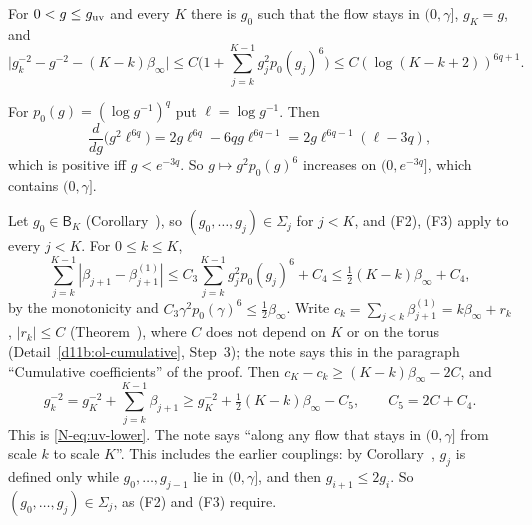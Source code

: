 \begin{detail}\label{d11b:ol-uv}
For $0<g\le g_{\rm uv}$ and every $K$ there is $g_0$ such that the flow stays in $(0,\gamma]$, $g_K=g$, and
\[
\Big|g_k^{-2}-g^{-2}-(K-k)\beta_\infty\Big|\le C\Big(1+\sum_{j=k}^{K-1}g_j^2p_0(g_j)^6\Big)\le C(\log(K-k+2))^{6q+1}.
\]
\end{detail}

\begin{step}[Monotonicity]
For $p_0(g)=(\log g^{-1})^q$ put $\ell=\log g^{-1}$. Then
\[
\frac d{dg}\big(g^2\ell^{6q}\big)=2g\ell^{6q}-6qg\ell^{6q-1}=2g\ell^{6q-1}(\ell-3q),
\]
which is positive iff $g<e^{-3q}$. So $g\mapsto g^2p_0(g)^6$ increases on $(0,e^{-3q}]$, which contains $(0,\gamma]$.
\end{step}

\begin{step}
Let $g_0\in\mathsf B_K$ (Corollary~), so $(g_0,\dots,g_j)\in\Sigma_j$ for $j<K$, and (F2), (F3) apply to every $j<K$. For $0\le k\le K$,
\[
\sum_{j=k}^{K-1}|\beta_{j+1}-\beta^{(1)}_{j+1}|\le C_3\sum_{j=k}^{K-1}g_j^2p_0(g_j)^6+C_4\le\tfrac12(K-k)\beta_\infty+C_4,
\]
by the monotonicity and $C_3\gamma^2p_0(\gamma)^6\le\frac12\beta_\infty$. Write $c_k=\sum_{j<k}\beta^{(1)}_{j+1}=k\beta_\infty+r_k$, $|r_k|\le C$ (Theorem~), where $C$ does not depend on $K$ or on the torus (Detail~\ref{d11b:ol-cumulative}, Step~3); the note says this in the paragraph ``Cumulative coefficients'' of the proof. Then $c_K-c_k\ge(K-k)\beta_\infty-2C$, and
\[
g_k^{-2}=g_K^{-2}+\sum_{j=k}^{K-1}\beta_{j+1}\ge g_K^{-2}+\tfrac12(K-k)\beta_\infty-C_5,\qquad C_5=2C+C_4 .
\]
This is \eqref{N-eq:uv-lower}. The note says ``along any flow that stays in $(0,\gamma]$ from scale $k$ to scale $K$''. This includes the earlier couplings: by Corollary~, $g_j$ is defined only while $g_0,\dots,g_{j-1}$ lie in $(0,\gamma]$, and then $g_{i+1}\le2g_i$. So $(g_0,\dots,g_j)\in\Sigma_j$, as (F2) and (F3) require.
\end{step}

